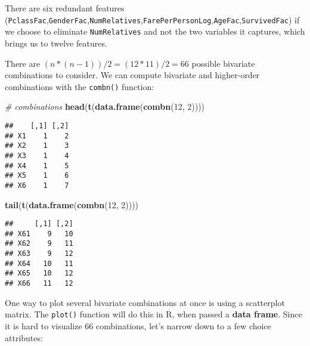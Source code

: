 \documentclass[]{article}
\newenvironment{Shaded}{\begin{snugshade}}{\end{snugshade}}
\newcommand{\KeywordTok}[1]{\textcolor[rgb]{0.13,0.29,0.53}{\textbf{#1}}}
\newcommand{\DecValTok}[1]{\textcolor[rgb]{0.00,0.00,0.81}{#1}}
\newcommand{\StringTok}[1]{\textcolor[rgb]{0.31,0.60,0.02}{#1}}
\newcommand{\CommentTok}[1]{\textcolor[rgb]{0.56,0.35,0.01}{\textit{#1}}}
\newcommand{\OperatorTok}[1]{\textcolor[rgb]{0.81,0.36,0.00}{\textbf{#1}}}
\newcommand{\NormalTok}[1]{#1}
\begin{document}
There are six redundant features
(\texttt{PclassFac},\texttt{GenderFac},\texttt{NumRelatives},\texttt{FarePerPersonLog},\texttt{AgeFac},\texttt{SurvivedFac})
if we choose to eliminate \texttt{NumRelatives} and not the two
variables it captures, which brings us to twelve features.

There are \((n * (n-1)) / 2 = (12 * 11)/2 = 66\) possible bivariate
combinations to consider. We can compute bivariate and higher-order
combinations with the \texttt{combn()} function:

\begin{Shaded}
\begin{Highlighting}[]
\CommentTok{# combinations}
\KeywordTok{head}\NormalTok{(}\KeywordTok{t}\NormalTok{(}\KeywordTok{data.frame}\NormalTok{(}\KeywordTok{combn}\NormalTok{(}\DecValTok{12}\NormalTok{, }\DecValTok{2}\NormalTok{))))}
\end{Highlighting}
\end{Shaded}

\begin{verbatim}
##    [,1] [,2]
## X1    1    2
## X2    1    3
## X3    1    4
## X4    1    5
## X5    1    6
## X6    1    7
\end{verbatim}

\begin{Shaded}
\begin{Highlighting}[]
\KeywordTok{tail}\NormalTok{(}\KeywordTok{t}\NormalTok{(}\KeywordTok{data.frame}\NormalTok{(}\KeywordTok{combn}\NormalTok{(}\DecValTok{12}\NormalTok{, }\DecValTok{2}\NormalTok{))))}
\end{Highlighting}
\end{Shaded}

\begin{verbatim}
##     [,1] [,2]
## X61    9   10
## X62    9   11
## X63    9   12
## X64   10   11
## X65   10   12
## X66   11   12
\end{verbatim}

One way to plot several bivariate combinations at once is using a
scatterplot matrix. The \texttt{plot()} function will do this in R, when
passed a \textbf{data frame}. Since it is hard to visualize 66
combinations, let's narrow down to a few choice attributes:

\begin{Shaded}
\end{Shaded}
\end{document}
